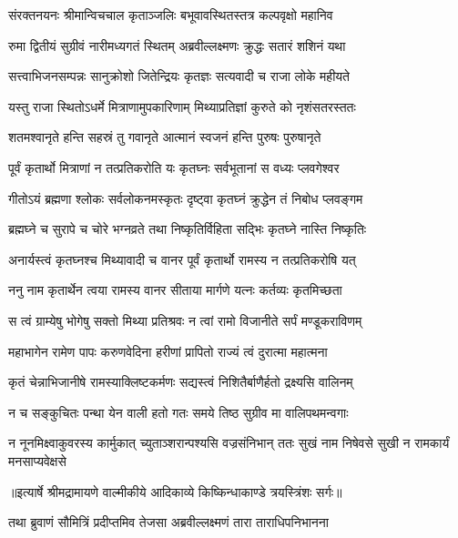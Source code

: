 \twolineshloka
{संरक्तनयनः श्रीमान्विचचाल कृताञ्जलिः}
{बभूवावस्थितस्तत्र कल्पवृक्षो महानिव} %

\twolineshloka
{रुमा द्वितीयं सुग्रीवं नारीमध्यगतं स्थितम्}
{अब्रवील्लक्ष्मणः क्रुद्धः सतारं शशिनं यथा} %

\twolineshloka
{सत्त्वाभिजनसम्पन्नः सानुक्रोशो जितेन्द्रियः}
{कृतज्ञः सत्यवादी च राजा लोके महीयते} %

\twolineshloka
{यस्तु राजा स्थितोऽधर्मे मित्राणामुपकारिणाम्}
{मिथ्याप्रतिज्ञां कुरुते को नृशंसतरस्ततः} %

\twolineshloka
{शतमश्वानृते हन्ति सहस्रं तु गवानृते}
{आत्मानं स्वजनं हन्ति पुरुषः पुरुषानृते} %

\twolineshloka
{पूर्वं कृतार्थो मित्राणां न तत्प्रतिकरोति यः}
{कृतघ्नः सर्वभूतानां स वध्यः प्लवगेश्वर} %

\twolineshloka
{गीतोऽयं ब्रह्मणा श्लोकः सर्वलोकनमस्कृतः}
{दृष्ट्वा कृतघ्नं क्रुद्धेन तं निबोध प्लवङ्गम} %

\twolineshloka
{ब्रह्मघ्ने च सुरापे च चोरे भग्नव्रते तथा}
{निष्कृतिर्विहिता सद्भिः कृतघ्ने नास्ति निष्कृतिः} %

\twolineshloka
{अनार्यस्त्वं कृतघ्नश्च मिथ्यावादी च वानर}
{पूर्वं कृतार्थो रामस्य न तत्प्रतिकरोषि यत्} %

\twolineshloka
{ननु नाम कृतार्थेन त्वया रामस्य वानर}
{सीताया मार्गणे यत्नः कर्तव्यः कृतमिच्छता} %

\twolineshloka
{स त्वं ग्राम्येषु भोगेषु सक्तो मिथ्या प्रतिश्रवः}
{न त्वां रामो विजानीते सर्पं मण्डूकराविणम्} %

\twolineshloka
{महाभागेन रामेण पापः करुणवेदिना}
{हरीणां प्रापितो राज्यं त्वं दुरात्मा महात्मना} %

\twolineshloka
{कृतं चेन्नाभिजानीषे रामस्याक्लिष्टकर्मणः}
{सद्यस्त्वं निशितैर्बाणैर्हतो द्रक्ष्यसि वालिनम्} %

\twolineshloka
{न च सङ्कुचितः पन्था येन वाली हतो गतः}
{समये तिष्ठ सुग्रीव मा वालिपथमन्वगाः} %

\fourlineindentedshloka
{न नूनमिक्ष्वाकुवरस्य कार्मुकात्}
{च्युताञ्शरान्पश्यसि वज्रसंनिभान्}
{ततः सुखं नाम निषेवसे सुखी}
{न रामकार्यं मनसाप्यवेक्षसे} %


{॥इत्यार्षे श्रीमद्रामायणे वाल्मीकीये आदिकाव्ये किष्किन्धाकाण्डे त्रयस्त्रिंशः सर्गः॥}


\twolineshloka
{तथा ब्रुवाणं सौमित्रिं प्रदीप्तमिव तेजसा}
{अब्रवील्लक्ष्मणं तारा ताराधिपनिभानना} %

